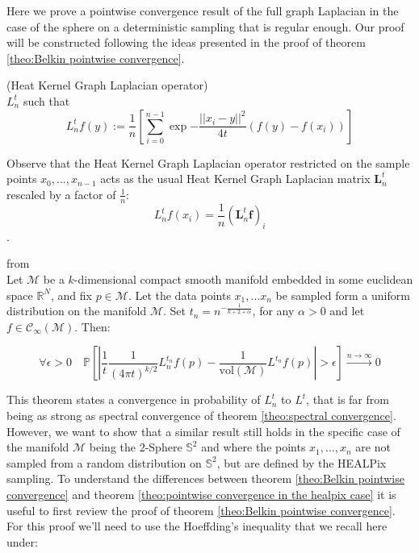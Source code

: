 \label{sec:Chapter2:pointwise convergence of the Heat Kernel Graph Laplacian on the Sphere}
Here we prove a pointwise convergence result of the full graph Laplacian in the case of the sphere on a deterministic sampling that is regular enough. Our proof will be constructed following the ideas presented in the proof of theorem \ref{theo:Belkin pointwise convergence}.
\vspace{0.5cm}
\begin{definition}{}(Heat Kernel Graph Laplacian operator)\\
	\label{def:Heat Kernel Graph Laplacian operator}
	$L_n^t$ such that
	$$L_n^tf(y) := \frac{1}{n}\left[ \sum_{i=0}^{n-1} \exp{-\frac{||x_i-y||^2}{4t}}\left(f(y)-f(x_i)\right)\right]$$
\end{definition}
\vspace{0.5cm}
Observe that the Heat Kernel Graph Laplacian operator restricted on the sample points $x_0, ..., x_{n-1}$ acts as the usual Heat Kernel Graph Laplacian matrix $\mathbf L_n^t$ rescaled by a factor of $\frac{1}{n}$:
$$L_n^tf(x_i) = \frac{1}{n} (\mathbf L_n^t\mathbf f)_i$$.
\vspace{0.5cm}
\begin{snugshade*}
\begin{theorem}{from \cite[Belkin et al.]{Belkin:2005:TTF:2138147.2138189}}\\
	\label{theo:Belkin pointwise convergence}
	Let $\mathcal M$ be a $k$-dimensional compact smooth manifold embedded in some euclidean space $\mathbb R^N$, and fix $p\in\mathcal M$. Let the data points $x_1, ... x_n$ be sampled form a uniform distribution on the manifold $\mathcal M$. Set $t_n=n^{-\frac{1}{k+2+\alpha}}$, for any $\alpha>0$ and let $f\in\mathcal C_\infty(\mathcal M)$. Then:
	
	$$\forall \epsilon>0\quad \mathbb{P}\left[\left|\frac{1}{t}\frac{1}{(4 \pi t)^{k/2}}L_{n}^{t_n} f(p)-  \frac{1}{\text{vol}(\mathcal M)}L^{t_n} f(p)\right|>\epsilon\right] \xrightarrow{n\to\infty} 0$$
\end{theorem}
\end{snugshade*}
\vspace{0.5cm}
This theorem states a convergence in probability of $L_n^t$ to $L^t$, that is far from being as strong as spectral convergence of theorem \ref{theo:spectral convergence}. However, we want to show that a similar result still holds in the specific case of the manifold $\mathcal M$ being the 2-Sphere $\mathbb S^2$ and where the points $x_1, ..., x_n$ are not sampled from a random distribution on $\mathbb S^2$, but are defined by the HEALPix sampling. To understand the differences between theorem \ref{theo:Belkin pointwise convergence} and theorem \ref{theo:pointwise convergence in the healpix case} it is useful to first review the proof of theorem \ref{theo:Belkin pointwise convergence}. For this proof we'll need to use the Hoeffding's inequality that we recall here under:

